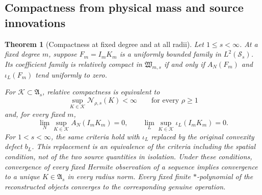 \documentclass[11pt,a4paper]{amsart}
\numberwithin{equation}{section}
\newtheorem{theorem}{Theorem}[section]
\theoremstyle{definition}
\theoremstyle{remark}
\newcommand{\Sch}{\mathcal S}
\newcommand{\Wc}{\mathfrak W}
\newcommand{\Alg}{\mathfrak A}
\newcommand{\Nn}[2]{\mathcal N_{#1,s}(#2)}
\begin{document}
\subsection{Compactness from physical mass and source innovations}
\begin{theorem}[Compactness at fixed degree and at all radii]\label{thm:fullcompact}
Let $1\le s<\infty$. At a fixed degree $m$, suppose $F_m=I_mK_m$ is a uniformly bounded family in $L^2(\Sch_s)$. Its coefficient family is relatively compact in $\Wc_{m,s}$ if and only if $A_N(F_m)$ and $\iota_L(F_m)$ tend uniformly to zero.

For $\mathcal K\subset\Alg_s$, relative compactness is equivalent to
\begin{equation}\label{eq:allradii-bounded}
 \sup_{K\in\mathcal K}\Nn\rho K<\infty\qquad\text{for every }\rho\ge1
\end{equation}
and, for every fixed $m$,
\begin{equation}\label{eq:allradii-defects}
 \lim_N\sup_{K\in\mathcal K}A_N(I_mK_m)=0,
 \qquad\lim_L\sup_{K\in\mathcal K}\iota_L(I_mK_m)=0.
\end{equation}
For $1<s<\infty$, the same criteria hold with $\iota_L$ replaced by the original convexity defect $b_L$. This replacement is an equivalence of the criteria including the spatial condition, not of the two source quantities in isolation.
Under these conditions, convergence of every fixed Hermite observation of a sequence implies convergence to a unique $K\in\Alg_s$ in every radius norm. Every fixed finite $*$-polynomial of the reconstructed objects converges to the corresponding genuine operation.
\end{theorem}
\end{document}
